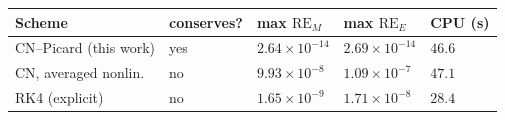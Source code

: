 \begin{tabular}{lllll}
\toprule
Scheme & conserves? & max $\mathrm{RE}_M$ & max $\mathrm{RE}_E$ & CPU (s) \\
\midrule
CN--Picard (this work) & yes & \(2.64\times10^{-14}\) & \(2.69\times10^{-14}\) & \(46.6\) \\
CN, averaged nonlin. & no & \(9.93\times10^{-8}\) & \(1.09\times10^{-7}\) & \(47.1\) \\
RK4 (explicit) & no & \(1.65\times10^{-9}\) & \(1.71\times10^{-8}\) & \(28.4\) \\
\bottomrule
\end{tabular}
